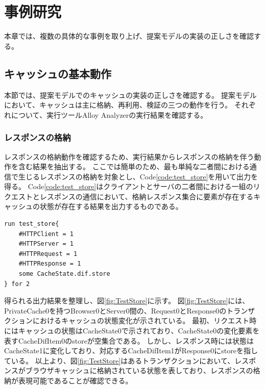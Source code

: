 \documentclass[12pt,a4paper]{jbook}
\begin{document}
\newpage

\chapter{事例研究}
本章では、複数の具体的な事例を取り上げ、提案モデルの実装の正しさを確認する。

\section{キャッシュの基本動作}
本節では、提案モデルでのキャッシュの実装の正しさを確認する。
提案モデルにおいて、キャッシュは主に格納、再利用、検証の三つの動作を行う。
それぞれについて、実行ツールAlloy Analyzerの実行結果を確認する。

\subsection{レスポンスの格納}
レスポンスの格納動作を確認するため、実行結果からレスポンスの格納を伴う動作を含む結果を抽出する。
ここでは簡単のため、最も単純な二者間における通信で生じるレスポンスの格納を対象とし、Code\ref{code:test_store}を用いて出力を得る。
Code\ref{code:test_store}はクライアントとサーバの二者間における一組のリクエストとレスポンスの通信において、格納レスポンス集合に要素が存在するキャッシュの状態が存在する結果を出力するものである。

\begin{lstlisting}[caption=レスポンスの格納, label=code:test_store]
run test_store{
	#HTTPClient = 1
	#HTTPServer = 1
	#HTTPRequest = 1
	#HTTPResponse = 1
	some CacheState.dif.store
} for 2
\end{lstlisting}

得られる出力結果を整理し、図\ref{fig:TestStore}に示す。
図\ref{fig:TestStore}には、PrivateCache0を持つBrowser0とServer0間の、Request0とResponse0のトランザクションにおけるキャッシュの状態変化が示されている。
最初、リクエスト時にはキャッシュの状態はCacheState0で示されており、CacheState0の変化要素を表すCacheDifItem0のstoreが空集合である。
しかし、レスポンス時には状態はCacheState1に変化しており、対応するCacheDifItem1がResponse0にstoreを指している。
以上より、図\ref{fig:TestStore}はあるトランザクションにおいて、レスポンスがブラウザキャッシュに格納されている状態を表しており、レスポンスの格納が表現可能であることが確認できる。
\end{document}
